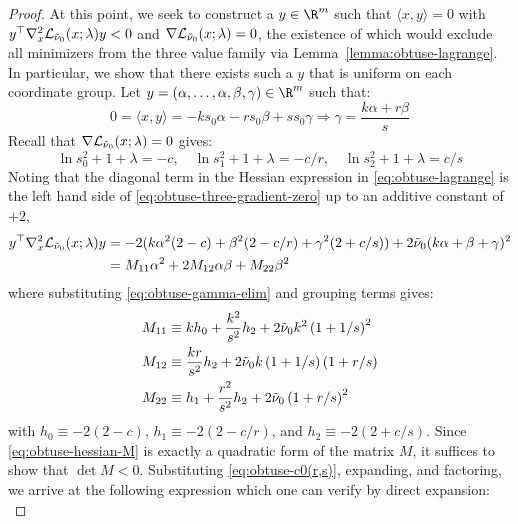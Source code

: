 \documentclass[11pt]{article}
\begin{document}
\begin{proof}
At this point, we seek to construct a $y\in \R^m $ such that $\langle x,y\rangle=0$ with $y^\top \nabla^2_x \mathcal L_{{\Tilde \nu_0}}(x;\lambda)y<0$ and $\nabla \mathcal L_{{\Tilde \nu_0}}(x;\lambda)=0$, the existence of which would exclude all minimizers from the three value family via Lemma~\ref{lemma:obtuse-lagrange}. In particular, we show that there exists such a $y$ that is uniform on each coordinate group. Let $y=(\alpha,\dots,\alpha,\beta,\gamma)\in \R^m $ such that:
\begin{equation}\label{eq:obtuse-gamma-elim}
    0=\langle x,y\rangle =-ks_0\alpha-rs_0\beta+ss_0\gamma \Rightarrow \gamma=\frac{k\alpha+r\beta}{s}
\end{equation}
Recall that $\nabla \mathcal L_{{\Tilde \nu_0}}(x;\lambda)=0$ gives:
\begin{equation}\label{eq:obtuse-three-gradient-zero}
    \ln s_0^2 + 1+\lambda=-c,\quad \ln s_1^2 +1 +\lambda =-c/r,\quad \ln s_2^2+1+\lambda=c/s
\end{equation}
Noting that the diagonal term in the Hessian expression in \eqref{eq:obtuse-lagrange} is the left hand side of \eqref{eq:obtuse-three-gradient-zero} up to an additive constant of $+2$, 
\begin{equation}\label{eq:obtuse-hessian-M}
\begin{aligned}
    y^\top \nabla_x^2 \mathcal L_{{\Tilde \nu_0}}(x;\lambda)y&=-2(k\alpha^2 (2-c)+\beta^2 (2-c/r)+\gamma^2 (2+c/s))+2{\Tilde \nu_0}(k\alpha+\beta +\gamma)^2\\
    &=M_{11}\alpha^2+2M_{12}\alpha\beta +M_{22}\beta^2 
\end{aligned}
\end{equation}
where substituting \eqref{eq:obtuse-gamma-elim} and grouping terms gives:
\begin{align}
M_{11}
&\equiv k h_0+\frac{k^2}{s^2}h_2+2{\Tilde \nu_0} k^2\left(1+1/s\right)^2\\
M_{12}
&\equiv \frac{kr}{s^2}h_2+2{\Tilde \nu_0} k\left(1+1/s\right)\left(1+r/s\right)\\
M_{22}
&\equiv h_1+\frac{r^2}{s^2}h_2+2{\Tilde \nu_0}\left(1+r/s\right)^2
\end{align}
with $h_0\equiv -2(2-c)$, $h_1\equiv -2(2-c/r)$, and $h_2\equiv -2(2+c/s)$.
Since \eqref{eq:obtuse-hessian-M} is exactly a quadratic form of the matrix $M$, it suffices to show that $\det M<0$. Substituting \eqref{eq:obtuse-c0(r,s)}, expanding, and factoring, we arrive at the following expression which one can verify by direct expansion:
\begin{equation}

\end{equation}
\end{proof}
\end{document}
